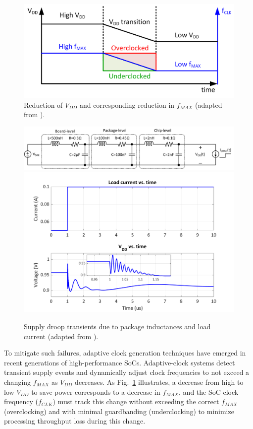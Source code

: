 \documentclass[twoside,9pt,journal,letterpage]{IEEEtran}
\begin{document}
\begin{figure}[h]
	\centering
	\includegraphics[width=0.85\columnwidth]{fig_fmax}
	\caption{Reduction of $V_{DD}$ and corresponding reduction in $f_{MAX}$ (adapted from \cite{ahmad2017}).}
	\label{fig:fmax}
\end{figure}
\begin{figure}[h]
	\centering
	\includegraphics[width=0.85\columnwidth]{fig_droop_schem}
	\includegraphics[width=0.85\columnwidth]{fig_droop}
	\caption{Supply droop transients due to package inductances and load current (adapted from \cite{hashimoto2018}).}
	\label{fig:droop}
\end{figure}

To mitigate such failures, adaptive clock generation techniques have emerged in recent generations of high-performance SoCs\cite{ahmad2017,hashimoto2018,wilcox2015,floyd2017,bowman2016}. Adaptive-clock systems detect transient supply events and dynamically adjust clock frequencies to not exceed a changing $f_{MAX}$ as $V_{DD}$ decreases. As Fig.\ \ref{fig:fmax} illustrates, a decrease from high to low $V_{DD}$ to save power corresponds to a decrease in $f_{MAX}$, and the SoC clock frequency ($f_{CLK}$) must track this change without exceeding the correct $f_{MAX}$ (overclocking) and with minimal guardbanding (underclocking) to minimize processing throughput loss during this change\cite{ahmad2017}. 
\end{document}
